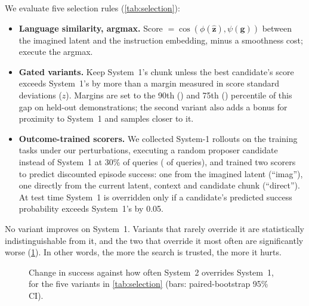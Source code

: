 \documentclass{article}
\begin{document}
We evaluate five selection rules (\cref{tab:selection}):
\begin{itemize}[leftmargin=*,itemsep=2pt]
  \item \textbf{Language similarity, argmax.} Score $=\cos(\phi(\hat{\bm z}),\psi(\bm g))$ between the imagined latent and the instruction embedding, minus a smoothness cost; execute the argmax.
  \item \textbf{Gated variants.} Keep System~1's chunk unless the best candidate's score exceeds System~1's by more than a margin measured in score standard deviations ($z$). Margins are set to the 90th (\gapPninety) and 75th (\gapPseventyfive) percentile of this gap on held-out demonstrations; the second variant also adds a bonus for proximity to System~1 and samples closer to it.
  \item \textbf{Outcome-trained scorers.} We collected \rollEpisodes{} System-1 rollouts on the training tasks under our perturbations, executing a random proposer candidate instead of System~1 at 30\% of queries (\rollExplored{} of \rollQueries{} queries), and trained two scorers to predict discounted episode success: one from the imagined latent (``imag''), one directly from the current latent, context and candidate chunk (``direct''). At test time System~1 is overridden only if a candidate's predicted success probability exceeds System~1's by 0.05.
\end{itemize}



\noindent No variant improves on System~1. Variants that rarely override it are statistically indistinguishable from it, and the two that override it most often are significantly worse (\cref{fig:override}). In other words, the more the search is trusted, the more it hurts.

\begin{figure}[t]
\centering
{}
\caption{Change in success against how often System~2 overrides System~1, for the five variants in \cref{tab:selection} (bars: paired-bootstrap 95\% CI).}
\label{fig:override}
\end{figure}
\end{document}
